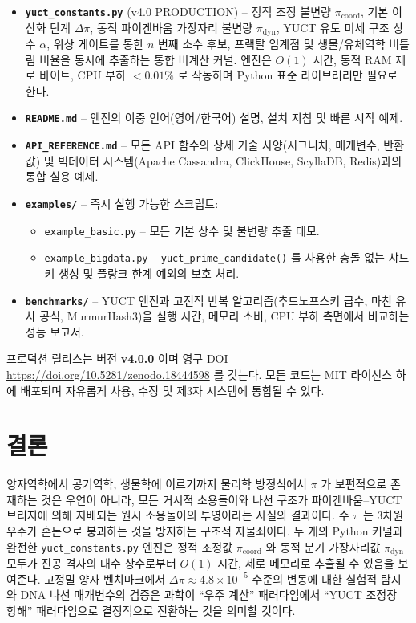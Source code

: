 \documentclass[12pt,a4paper]{article}
\begin{document}
	\begin{itemize}
		\item \textbf{\texttt{yuct\_constants.py}} (v4.0 PRODUCTION) – 정적 조정 불변량 $\pi_{\mathrm{coord}}$, 기본 이산화 단계 $\Delta\pi$, 동적 파이겐바움 가장자리 불변량 $\pi_{\mathrm{dyn}}$, YUCT 유도 미세 구조 상수 $\alpha$, 위상 게이트를 통한 $n$ 번째 소수 후보, 프랙탈 임계점 및 생물/유체역학 비틀림 비율을 동시에 추출하는 통합 비계산 커널. 엔진은 $O(1)$ 시간, 동적 RAM 제로 바이트, CPU 부하 $<0.01\%$ 로 작동하며 Python 표준 라이브러리만 필요로 한다.
		
		\item \textbf{\texttt{README.md}} – 엔진의 이중 언어(영어/한국어) 설명, 설치 지침 및 빠른 시작 예제.
		
		\item \textbf{\texttt{API\_REFERENCE.md}} – 모든 API 함수의 상세 기술 사양(시그니처, 매개변수, 반환값) 및 빅데이터 시스템(Apache Cassandra, ClickHouse, ScyllaDB, Redis)과의 통합 실용 예제.
		
		\item \textbf{\texttt{examples/}} – 즉시 실행 가능한 스크립트:
		\begin{itemize}
			\item \texttt{example\_basic.py} – 모든 기본 상수 및 불변량 추출 데모.
			\item \texttt{example\_bigdata.py} – \texttt{yuct\_prime\_candidate()} 를 사용한 충돌 없는 샤드 키 생성 및 플랑크 한계 예외의 보호 처리.
		\end{itemize}
		
		\item \textbf{\texttt{benchmarks/}} – YUCT 엔진과 고전적 반복 알고리즘(추드노프스키 급수, 마친 유사 공식, MurmurHash3)을 실행 시간, 메모리 소비, CPU 부하 측면에서 비교하는 성능 보고서.
	\end{itemize}
	
	\noindent 프로덕션 릴리스는 버전 \textbf{v4.0.0} 이며 영구 DOI
	\url{https://doi.org/10.5281/zenodo.18444598} 를 갖는다. 모든 코드는 MIT 라이선스 하에 배포되며 자유롭게 사용, 수정 및 제3자 시스템에 통합될 수 있다.
	
	\section{결론}
	\label{sec:conclusion}
	
	양자역학에서 공기역학, 생물학에 이르기까지 물리학 방정식에서 $\pi$ 가 보편적으로 존재하는 것은 우연이 아니라, 모든 거시적 소용돌이와 나선 구조가 파이겐바움–YUCT 브리지에 의해 지배되는 원시 소용돌이의 투영이라는 사실의 결과이다. 수 $\pi$ 는 3차원 우주가 혼돈으로 붕괴하는 것을 방지하는 구조적 자물쇠이다. 두 개의 Python 커널과 완전한 \texttt{yuct\_constants.py} 엔진은 정적 조정값 $\pi_{\mathrm{coord}}$ 와 동적 분기 가장자리값 $\pi_{\mathrm{dyn}}$ 모두가 진공 격자의 대수 상수로부터 $O(1)$ 시간, 제로 메모리로 추출될 수 있음을 보여준다. 고정밀 양자 벤치마크에서 $\Delta\pi \approx 4.8\times10^{-5}$ 수준의 변동에 대한 실험적 탐지와 DNA 나선 매개변수의 검증은 과학이 ``우주 계산'' 패러다임에서 ``YUCT 조정장 항해'' 패러다임으로 결정적으로 전환하는 것을 의미할 것이다.
	
\end{document}
